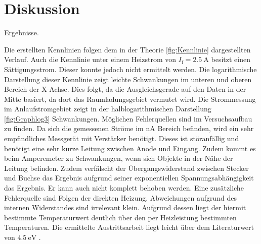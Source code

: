 
\section{Diskussion}
\label{sec:Diskussion}

 \begin{table}
 	\centering
 	\caption{Ergebnisse.}
 	
 \end{table}

Die erstellten Kennlinien folgen dem in der Theorie \ref{fig:Kennlinie} dargestellten Verlauf.
 Auch die Kennlinie unter einem Heizstrom von $I_\text{f} = \SI{2.5}{\ampere}$
 besitzt einen Sättigungsstrom. Dieser konnte jedoch nicht ermittelt werden.
Die logarithmische Darstellung dieser Kennlinie zeigt leichte Schwankungen im
unteren und oberen Bereich der X-Achse. Dies folgt, da die Ausgleichsgerade auf
den Daten in der Mitte basiert, da dort das Raumladungsgebiet vermutet wird.
Die Strommessung im Anlaufstromgebiet zeigt in der halblogarithmischen
Darstellung \ref{fig:Graphlog3} Schwankungen. Möglichen Fehlerquellen sind im
Versuchsaufbau zu finden. Da sich die gemessenen Ströme im $\si{\nano\ampere}$
Bereich befinden, wird ein sehr empfindliches Messgerät mit Verstärker benötigt.
Dieses ist störanfällig und benötigt eine sehr kurze Leitung zwischen Anode und Eingang.
Zudem kommt es beim Amperemeter zu Schwankungen, wenn sich Objekte in der Nähe der
Leitung befinden. Zudem verfälscht der Übergangswiderstand zwischen Stecker und
Buchse das Ergebnis aufgrund seiner exponentiellen Spannungsabhängigkeit das Ergebnis.
 Er kann auch nicht komplett behoben werden. Eine zusätzliche Fehlerquelle sind
 Folgen der direkten Heizung. Abweichungen aufgrund des internen Widerstandes
 sind irrelevant klein. Aufgrund dessen liegt der hiermit bestimmte Temperaturwert
 deutlich über den per Heizleistung bestimmten Temperaturen. Die ermittelte
 Austrittsarbeit liegt leicht über dem Literaturwert von $\SI{4.5}{\electronvolt}$ \cite{wolfaus}. 
